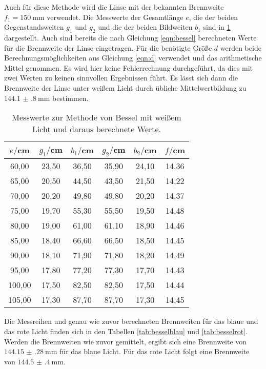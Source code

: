 Auch für diese Methode wird die Linse mit der bekannten Brennweite $f_1 = \SI{150}{\milli\meter}$
verwendet. Die Messwerte der Gesamtlänge $e$, die der beiden Gegenstandsweiten $g_1$ und $g_2$
und die der beiden Bildweiten $b_1$ sind in \ref{tab:bessel} dargestellt. Auch sind
bereits die nach Gleichung \eqref{eqn:bessel} berechneten Werte für die Brennweite
der Linse eingetragen. Für die benötigte Größe $d$ werden beide Berechnungsmöglichkeiten
aus Gleichung \eqref{eqn:d} verwendet und das arithmetische Mittel genommen. Es wird hier keine
Fehlerrechnung durchgeführt, da dies mit zwei Werten zu keinen sinnvollen Ergebnissen
führt. Es lässt sich dann die Brennweite der Linse unter weißem Licht durch
übliche Mittelwertbildung zu $\SI{144.1(8)}{\milli\meter}$ bestimmen.

\begin{table}[htp]
	\begin{center}
    \caption{Messwerte zur Methode von Bessel mit weißem Licht und daraus berechnete Werte.}
    \label{tab:bessel}
		\begin{tabular}{cccccc}
		\toprule
			{$e/$cm} & {$g_1/$cm} & {$b_1/$cm} & {$g_2/$cm} & {$b_2/$cm} & {$f/$cm}\\
			\midrule
			60,00 & 23,50 & 36,50 & 35,90 & 24,10 & 14,36\\
			65,00 & 20,50 & 44,50 & 43,50 & 21,50 & 14,22\\
			70,00 & 20,20 & 49,80 & 49,80 & 20,20 & 14,37\\
			75,00 & 19,70 & 55,30 & 55,50 & 19,50 & 14,48\\
			80,00 & 19,00 & 61,00 & 61,10 & 18,90 & 14,46\\
			85,00 & 18,40 & 66,60 & 66,50 & 18,50 & 14,45\\
			90,00 & 18,10 & 71,90 & 71,80 & 18,20 & 14,49\\
			95,00 & 17,80 & 77,20 & 77,30 & 17,70 & 14,43\\
			100,00 & 17,50 & 82,50 & 82,50 & 17,50 & 14,44\\
			105,00 & 17,30 & 87,70 & 87,70 & 17,30 & 14,45\\
		\bottomrule
		\end{tabular}
	\end{center}
\end{table}

\newpage
Die Messreihen und genau wie zuvor berechneten Brennweiten für das blaue und das
rote Licht finden sich in den Tabellen \ref{tab:besselblau} und \ref{tab:besselrot}.
Werden die Brennweiten wie zuvor gemittelt,
ergibt sich eine Brennweite von $\SI{144.15(28)}{\milli\meter}$ für das blaue Licht.
Für das rote Licht folgt eine Brennweite von $\SI{144.5(4)}{\milli\meter}$.

